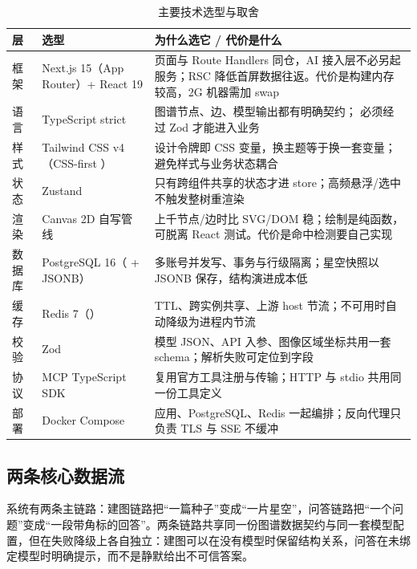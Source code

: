 \begin{table}[htbp]
  \centering
  \footnotesize
  \caption{主要技术选型与取舍}
  \label{tab:stack}
  \begin{tabularx}{\textwidth}{L{2.5cm}L{4.2cm}Y}
    \toprule
\textbf{层} & \textbf{选型} & \textbf{为什么选它 / 代价是什么} \\
    \midrule
    框架 & Next.js 15（App Router）+ React 19 & 页面与 Route Handlers 同仓，AI 接入层不必另起服务；RSC 降低首屏数据往返。代价是构建内存较高，2G 机器需加 swap \\
    语言 & TypeScript strict & 图谱节点、边、模型输出都有明确契约； 必须经过 Zod 才能进入业务 \\
    样式 & Tailwind CSS v4（CSS-first ） & 设计令牌即 CSS 变量，换主题等于换一套变量；避免样式与业务状态耦合 \\
    状态 & Zustand & 只有跨组件共享的状态才进 store；高频悬浮/选中不触发整树重渲染 \\
    渲染 & Canvas 2D 自写管线 & 上千节点/边时比 SVG/DOM 稳；绘制是纯函数，可脱离 React 测试。代价是命中检测要自己实现 \\
    数据库 & PostgreSQL 16（ + JSONB） & 多账号并发写、事务与行级隔离；星空快照以 JSONB 保存，结构演进成本低 \\
    缓存 & Redis 7（） & TTL、跨实例共享、上游 host 节流；不可用时自动降级为进程内节流 \\
    校验 & Zod & 模型 JSON、API 入参、图像区域坐标共用一套 schema；解析失败可定位到字段 \\
    协议 & MCP TypeScript SDK & 复用官方工具注册与传输；HTTP 与 stdio 共用同一份工具定义 \\
    部署 & Docker Compose & 应用、PostgreSQL、Redis 一起编排；反向代理只负责 TLS 与 SSE 不缓冲 \\
    \bottomrule
  \end{tabularx}
\end{table}

\subsection{两条核心数据流}

系统有两条主链路：建图链路把“一篇种子”变成“一片星空”，问答链路把“一个问题”变成“一段带角标的回答”。两条链路共享同一份图谱数据契约与同一套模型配置，但在失败降级上各自独立：建图可以在没有模型时保留结构关系，问答在未绑定模型时明确提示，而不是静默给出不可信答案。

